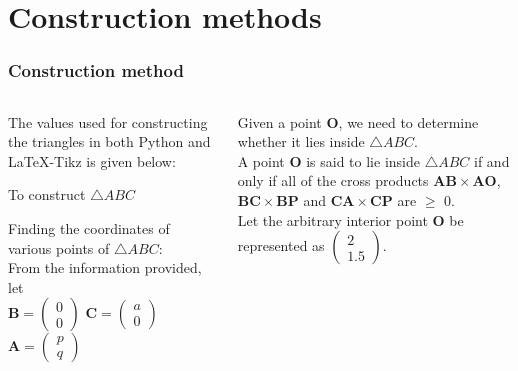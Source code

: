 \documentclass{beamer}
\renewcommand{\vec}[1]{\mathbf{#1}}
\begin{document}
\section*{Construction methods}
\begin{frame}[fragile]
\footnotesize
\frametitle{Construction method}
\begin{columns}
\begin{column}{0.5\textwidth}
The values used for constructing the triangles in both Python and \LaTeX{}-Tikz is given below:
\begin{table}[ht]
    \begin{center}
    	
  \caption{To construct $\triangle ABC$}
   \label{table:table1}
   \end{center}	
\end{table}

Finding the coordinates of various points of  $\triangle ABC$:\\
From the information provided, let\\
    \quad $ \vec{B}= \begin{pmatrix}0\\0\end{pmatrix}$
    \quad $\vec{C}=\begin{pmatrix}a\\0\end{pmatrix}$
    \quad $\vec{A}=\begin{pmatrix}p\\q\end{pmatrix}$
 \end{column}
\begin{column}{0.5\textwidth}   
    Given a point $\vec{O}$, we need to determine whether it lies inside $\triangle ABC$.\\ 
      A point $\vec{O}$ is said to lie inside $\triangle ABC$ if and only if all of the cross products $\vec{AB} \times \vec{AO}$, 
      $\vec{BC} \times \vec{BP}$  and $\vec{CA} \times \vec{CP}$ are $\geqslant$ 0.\\
   

  Let the arbitrary interior point $\vec{O}$ be represented as $\begin{pmatrix}2\\1.5\end{pmatrix}$.\quad

 
    
\end{column}
\end{columns}
\end{frame}
\end{document}
